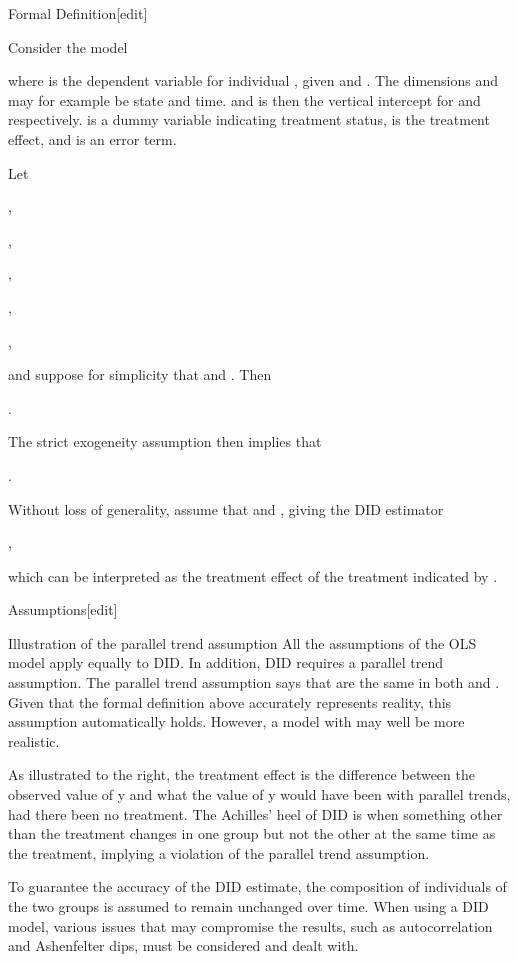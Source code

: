  



Formal Definition[edit]
 
Consider the model
 


where is the dependent variable for individual , given and . The dimensions and may for example be state and time. and is then the vertical intercept for and respectively. is a dummy variable indicating treatment status, is the treatment effect, and is an error term.
 
Let
 
,
 
,
 
,
 
,
 
,
 
and suppose for simplicity that and . Then
 




.
 
The strict exogeneity assumption then implies that
 
.
 
Without loss of generality, assume that and , giving the DID estimator
 
,
 
which can be interpreted as the treatment effect of the treatment indicated by .
 
Assumptions[edit]
 




Illustration of the parallel trend assumption 
All the assumptions of the OLS model apply equally to DID. In addition, DID requires a parallel trend assumption. The parallel trend assumption says that are the same in both and . Given that the formal definition above accurately represents reality, this assumption automatically holds. However, a model with may well be more realistic.
 
As illustrated to the right, the treatment effect is the difference between the observed value of y and what the value of y would have been with parallel trends, had there been no treatment. The Achilles' heel of DID is when something other than the treatment changes in one group but not the other at the same time as the treatment, implying a violation of the parallel trend assumption.
 
To guarantee the accuracy of the DID estimate, the composition of individuals of the two groups is assumed to remain unchanged over time. When using a DID model, various issues that may compromise the results, such as autocorrelation and Ashenfelter dips, must be considered and dealt with.
